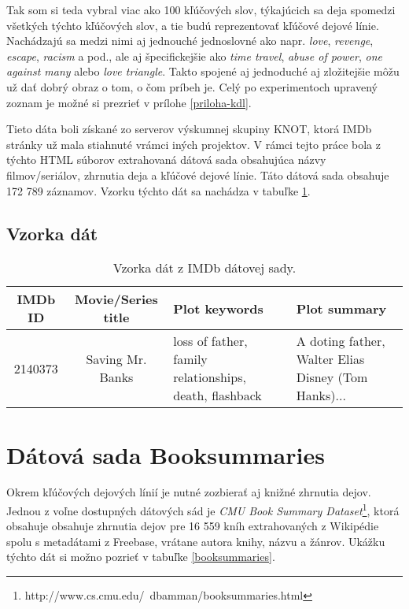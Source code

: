 Tak som si teda vybral viac ako 100 kľúčových slov, týkajúcich sa deja spomedzi všetkých týchto kľúčových slov, a tie budú reprezentovať kľúčové dejové línie. Nachádzajú sa medzi nimi aj jednouché jednoslovné ako napr. \textit{love}, \textit{revenge}, \textit{escape}, \textit{racism} a pod., ale aj špecifickejšie ako \textit{time travel}, \textit{abuse of power}, \textit{one against many} alebo \textit{love triangle}. Takto spojené aj jednoduché aj zložitejšie môžu už dať dobrý obraz o tom, o čom príbeh je. Celý po experimentoch upravený zoznam je možné si prezrieť v prílohe \ref{priloha-kdl}. 

Tieto dáta boli získané zo serverov výskumnej skupiny KNOT, ktorá IMDb stránky už mala stiahnuté vrámci iných projektov. V rámci tejto práce bola z týchto HTML súborov extrahovaná dátová sada obsahujúca názvy filmov/seriálov, zhrnutia deja a kľúčové dejové línie. Táto dátová sada obsahuje 172 789 záznamov. Vzorku týchto dát sa nachádza v tabuľke \ref{imdb}.

\subsection*{Vzorka dát}

\begin{table}[hbt]
\centering
\caption{Vzorka dát z IMDb dátovej sady.}
\label{imdb}
\begin{tabular}{|c|c|
>{\centering\arraybackslash}m{7em}|
>{\centering\arraybackslash}m{7em}|}
\hline
IMDb ID & Movie/Series title & Plot keywords & Plot summary \\
\hline
2140373 & Saving Mr. Banks & loss of father, family relationships, death, flashback &  A doting father, Walter Elias Disney (Tom Hanks)...\\ 
\hline

\end{tabular}
\end{table}

\section{Dátová sada Booksummaries}
Okrem kľúčových dejových línií je nutné zozbierať aj knižné zhrnutia dejov. Jednou z voľne dostupných dátových sád je \textit{CMU Book Summary Dataset}\footnote{http://www.cs.cmu.edu/~dbamman/booksummaries.html}, ktorá obsahuje obsahuje zhrnutia dejov pre 16 559 kníh extrahovaných z Wikipédie spolu s metadátami z Freebase, vrátane autora knihy, názvu a žánrov. Ukážku týchto dát si možno pozrieť v tabuľke \ref{booksummaries}.

